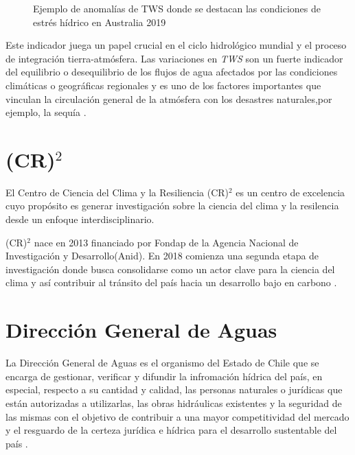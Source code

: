 \begin{figure}[H]
    \centering
          \goodgap
          \vskip -0.1in
    \caption[Ejemplo de anomalías de TWS]{\footnotesize Ejemplo de anomalías de TWS donde se destacan las condiciones de estrés hídrico en Australia 2019}
    \label{logo1}
\end{figure}
Este indicador juega un  papel crucial en el ciclo hidrológico mundial y el proceso de integración tierra-atmósfera. Las variaciones en \textit{TWS} son
un fuerte indicador del equilibrio o desequilibrio de los flujos de agua afectados por las condiciones climáticas o geográficas
regionales y es uno de los factores importantes que vinculan la circulación general de la atmósfera con los desastres naturales,por ejemplo, la sequía \cite{15}.
%
%
%
%
\section{(CR)$^2$}
El Centro de Ciencia del Clima y la Resiliencia (CR)$^2$ es un centro de excelencia cuyo propósito es generar investigación
sobre la ciencia del clima y la resilencia desde un enfoque interdisciplinario. 

(CR)$^2$ nace en 2013 financiado por Fondap de la Agencia Nacional de Investigación y Desarrollo(Anid). En 2018 comienza una segunda etapa
de investigación donde busca consolidarse como un actor clave para la ciencia del clima y así contribuir al tránsito del país hacia un desarrollo 
bajo en carbono \cite{cr2}.

%
%
%
%
\section{Dirección General de Aguas}
La Dirección General de Aguas es el organismo del Estado de Chile que se encarga de gestionar, verificar y difundir la infromación 
hídrica del país, en especial, respecto a su cantidad y calidad, las personas naturales o jurídicas que están autorizadas a utilizarlas,
las obras hidráulicas existentes y la seguridad de las mismas con el objetivo de contribuir a una mayor competitividad 
del mercado y el resguardo de la certeza jurídica e hídrica para el desarrollo sustentable del país \cite{dga}.

%
%
%
%
